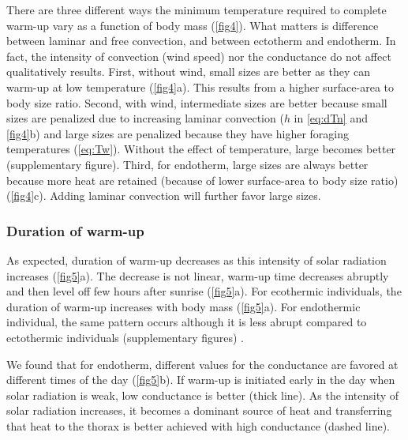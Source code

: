 There are three different ways the minimum temperature required to complete warm-up vary as a function of body mass (\cref{fig4}). %
What matters is difference between laminar and free convection, and between ectotherm  and endotherm. 
In fact, the intensity of convection (wind speed) nor the conductance do not affect qualitatively results.
First, without wind, small sizes are better as they can warm-up at low temperature (\cref{fig4}a).
This results from a higher surface-area to body size ratio.
Second, with wind, intermediate sizes are better because small sizes are penalized due to increasing laminar convection ($h$ in \cref{eq:dTn} and \cref{fig4}b)  and large sizes are penalized because they have higher foraging temperatures (\cref{eq:Tw}). 
Without the effect of temperature, large becomes better (supplementary figure).
Third, for endotherm, large sizes are always better because more heat are retained (because of lower surface-area to body size ratio) (\cref{fig4}c).
Adding laminar convection will further favor large sizes.
\subsubsection*{Duration of warm-up}
As expected, duration of warm-up decreases as this intensity of solar radiation increases (\cref{fig5}a).
The decrease is not linear, warm-up time decreases abruptly and then level off few hours after sunrise (\cref{fig5}a).
For ecothermic individuals, the duration of warm-up increases with body mass (\cref{fig5}a).
For endothermic individual, the same pattern occurs although it is less abrupt compared to ectothermic individuals (supplementary figures) .

We found that for endotherm, different values for the conductance are favored at different times of the day (\cref{fig5}b).
If warm-up is initiated early in the day when solar radiation is weak, low conductance is better (thick line). %
As the intensity of solar radiation increases, it becomes a dominant source of heat and transferring that heat to the thorax is better achieved with high conductance (dashed line).

